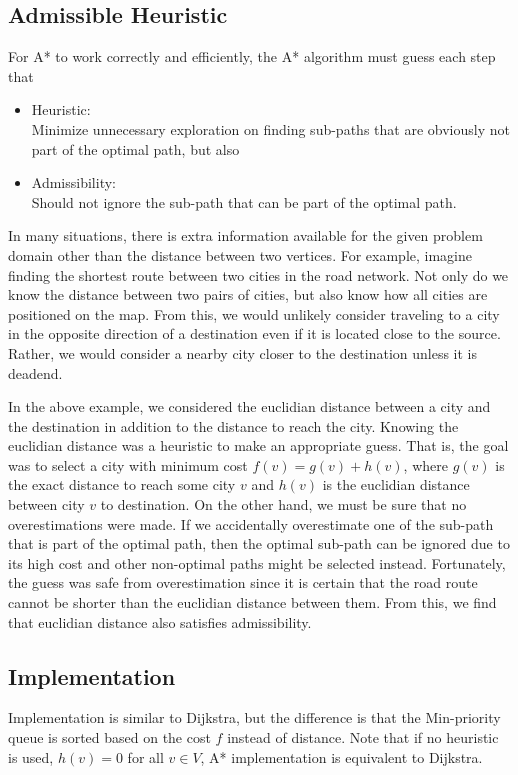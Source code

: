 \documentclass{article}
\begin{document}
\subsection{Admissible Heuristic}
For A* to work correctly and efficiently, the A* algorithm must guess each step that
\begin{itemize}
    \item Heuristic: \\
    Minimize unnecessary exploration on finding sub-paths that are obviously not part of the optimal path\cite{HNR}, but also 
    \item Admissibility: \\
    Should not ignore the sub-path that can be part of the optimal path\cite{HNR}. 
\end{itemize}
In many situations, there is extra information available for the given problem domain other than the distance between two vertices. For example, imagine finding the shortest route between two cities in the road network. Not only do we know the distance between two pairs of cities, but also know how all cities are positioned on the map. From this, we would unlikely consider traveling to a city in the opposite direction of a destination even if it is located close to the source. Rather, we would consider a nearby city closer to the destination unless it is deadend. 

In the above example, we considered the euclidian distance between a city and the destination in addition to the distance to reach the city. Knowing the euclidian distance was a heuristic to make an appropriate guess. That is, the goal was to select a city with minimum cost $f(v) = g(v) + h(v)$, where $g(v)$ is the exact distance to reach some city $v$ and $h(v)$ is the euclidian distance between city $v$ to destination. On the other hand, we must be sure that no overestimations were made. If we accidentally overestimate one of the sub-path that is part of the optimal path, then the optimal sub-path can be ignored due to its high cost and other non-optimal paths might be selected instead. Fortunately, the guess was safe from overestimation since it is certain that the road route cannot be shorter than the euclidian distance between them\cite{HNR}. From this, we find that euclidian distance also satisfies admissibility.


\subsection{Implementation}
Implementation is similar to Dijkstra, but the difference is that the Min-priority queue is sorted based on the cost $f$ instead of distance. Note that if no heuristic is used, $h(v) = 0$ for all $v \in V$, A* implementation is equivalent to Dijkstra.
\end{document}
